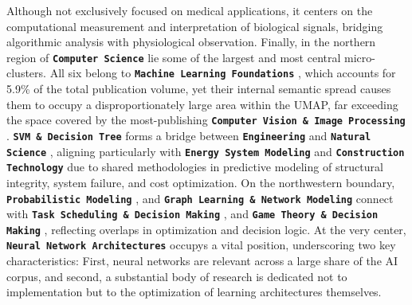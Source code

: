 \documentclass{article}
\begin{document}
	Although not exclusively focused on medical applications, it centers on the computational measurement and interpretation of biological signals, bridging algorithmic analysis with physiological observation. Finally, in the northern region of \textbf{\texttt{Computer Science}}  lie some of the largest and most central micro-clusters. All six belong to \textbf{\texttt{Machine Learning Foundations}} , which accounts for 5.9\% of the total publication volume, yet their internal semantic spread causes them to occupy a disproportionately large area within the UMAP, far exceeding the space covered by the most-publishing \textbf{\texttt{Computer Vision \& Image Processing}} . \textbf{\texttt{SVM \& Decision Tree}}  forms a bridge between \textbf{\texttt{Engineering}}  and \textbf{\texttt{Natural Science}} , aligning particularly with \textbf{\texttt{Energy System Modeling}}  and \textbf{\texttt{Construction Technology}}  due to shared methodologies in predictive modeling of structural integrity, system failure, and cost optimization. On the northwestern boundary, \textbf{\texttt{Probabilistic Modeling}} , and \textbf{\texttt{Graph Learning \& Network Modeling}}  connect with \textbf{\texttt{Task Scheduling \& Decision Making}} , and \textbf{\texttt{Game Theory \& Decision Making}} , reflecting overlaps in optimization and decision logic. At the very center, \textbf{\texttt{Neural Network Architectures}}  occupys a vital position, underscoring two key characteristics: First, neural networks are relevant across a large share of the AI corpus, and second, a substantial body of research is dedicated not to implementation but to the optimization of learning architectures themselves.
	
\end{document}
